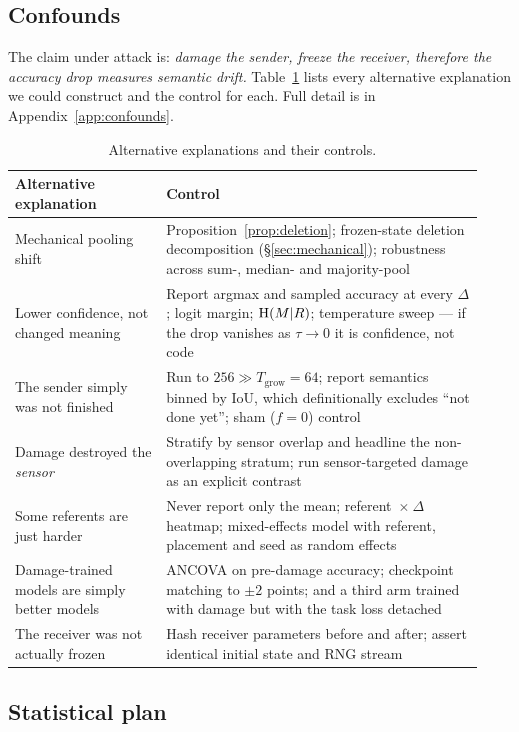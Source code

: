 \subsection{Confounds}

The claim under attack is: \emph{damage the sender, freeze the receiver,
therefore the accuracy drop measures semantic drift.} Table~\ref{tab:confounds}
lists every alternative explanation we could construct and the control for each.
Full detail is in Appendix~\ref{app:confounds}.

\begin{table}[t]
\centering
\small
\caption{Alternative explanations and their controls.}
\label{tab:confounds}
\begin{tabular}{@{}p{0.30\linewidth}p{0.63\linewidth}@{}}
\toprule
\textbf{Alternative explanation} & \textbf{Control} \\
\midrule
Mechanical pooling shift &
  Proposition~\ref{prop:deletion}; frozen-state deletion decomposition
  (\S\ref{sec:mechanical}); robustness across sum-, median- and majority-pool \\
Lower confidence, not changed meaning &
  Report argmax and sampled accuracy at every $\Delta$; logit margin;
  $\mathrm{H}(M|R)$; temperature sweep --- if the drop vanishes as $\tau \to 0$ it is
  confidence, not code \\
The sender simply was not finished &
  Run to $256 \gg T_{\mathrm{grow}}=64$; report semantics binned by IoU, which
  definitionally excludes ``not done yet''; sham ($f=0$) control \\
Damage destroyed the \emph{sensor} &
  Stratify by sensor overlap and headline the non-overlapping stratum; run
  sensor-targeted damage as an explicit contrast \\
Some referents are just harder &
  Never report only the mean; referent~$\times~\Delta$ heatmap; mixed-effects
  model with referent, placement and seed as random effects \\
Damage-trained models are simply better models &
  ANCOVA on pre-damage accuracy; checkpoint matching to $\pm2$ points; and a
  third arm trained with damage but with the task loss detached \\
The receiver was not actually frozen &
  Hash receiver parameters before and after; assert identical initial state and
  RNG stream \\
\bottomrule
\end{tabular}
\end{table}

\subsection{Statistical plan}

